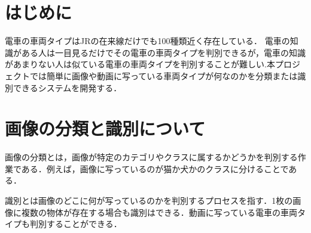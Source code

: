 \maketitle
\begin{multicols*}{2} %



\section{はじめに}
電車の車両タイプはJRの在来線だけでも100種類近く存在している．
電車の知識がある人は一目見るだけでその電車の車両タイプを判別できるが，電車の知識があまりない人は似ている電車の車両タイプを判別することが難しい.本プロジェクトでは簡単に画像や動画に写っている車両タイプが何なのかを分類または識別できるシステムを開発する．

\section{画像の分類と識別について}
画像の分類とは，画像が特定のカテゴリやクラスに属するかどうかを判別する作業である．例えば，画像に写っているのが猫か犬かのクラスに分けることである．

識別とは画像のどこに何が写っているのかを判別するプロセスを指す．1枚の画像に複数の物体が存在する場合も識別はできる．動画に写っている電車の車両タイプも判別することができる．


\end{multicols*}
